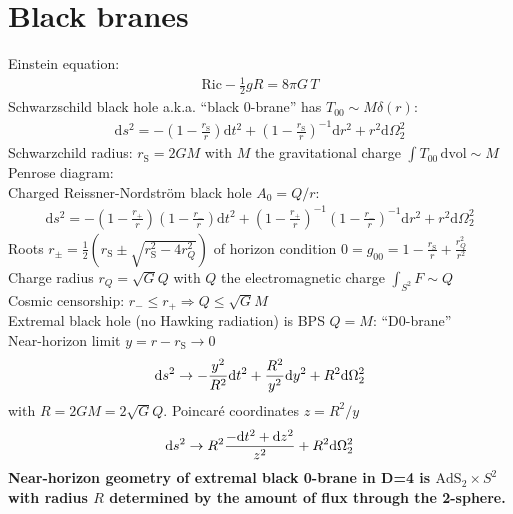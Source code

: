 \documentclass[12pt]{article}
\begin{document}
\section{Black branes}
Einstein equation:
\begin{eqnarray}
\mathrm{Ric}-\frac12 g R =8\pi G\, T
\end{eqnarray}
Schwarzschild black hole a.k.a. ``black 0-brane'' has $T_{00}\sim M\delta(r)$:
\begin{eqnarray}
\mathrm d s^2 = -\left( 1-\frac {r_\mathrm S} r\right) \mathrm dt^2 +\left( 1-\frac {r_\mathrm S} r\right)^{-1} \mathrm dr^2+r^2\mathrm d\Omega_2^2
\end{eqnarray}
Schwarzchild radius: $r_\mathrm S=2GM$ with $M$ the gravitational charge $\int T_{00}\, \mathrm {dvol}\sim M$\\
Penrose diagram: \\
Charged Reissner-Nordstr\"om black hole $A_0=Q/r$:
\begin{eqnarray}
\mathrm d s^2 = -\left( 1-\frac {r_+} r\right)\left( 1-\frac {r_-} r\right) \mathrm dt^2 +\left( 1-\frac {r_+} r\right)^{-1}\left( 1-\frac {r_-} r\right)^{-1} \mathrm dr^2+r^2\mathrm d\Omega_2^2
\end{eqnarray}
Roots $r_\pm = \frac12\left(r_\mathrm S\pm \sqrt{r_\mathrm S^2-4r_Q^2}\right)$ of horizon condition $0=g_{00}=1-\frac {r_\mathrm S}r+ \frac {r_Q^2}{r^2}$\\
Charge radius $r_Q = \sqrt{G} Q$ with $Q$ the electromagnetic charge $\int_{S^2} F \sim Q$\\
Cosmic censorship: $r_-\leq r_+ \Rightarrow Q\leq \sqrt{G}M$\\
Extremal black hole (no Hawking radiation) is BPS $Q=M$: ``D0-brane''\\
Near-horizon limit $y=r- r_\mathrm S\to 0$
\begin{eqnarray}
\mathrm d s^2 \to -{y^2\over R^2} \mathrm dt^2 +{R^2\over y^2} \mathrm dy^2+R^2\mathrm d\Omega_2^2
\end{eqnarray}
with $R=2GM=2\sqrt{G}Q$. Poincar\'e coordinates $z=R^2/y$
\begin{eqnarray}
\mathrm d s^2 \to R^2{-\mathrm dt^2 + \mathrm dz^2 \over z^2}+R^2\mathrm d\Omega_2^2
\end{eqnarray}
{\bf Near-horizon geometry of extremal black 0-brane in D=4 is $\mathrm {AdS}_2\times S^2$ with radius $R$ determined by the amount of flux through the 2-sphere.}

\end{document}
